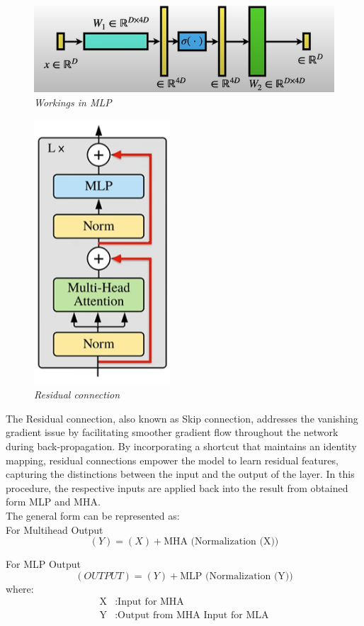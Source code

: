 \begin{figure}[htbp]
    \centering
    \includegraphics[width=5in]{img/MLP workings.png}
    \caption{\textit{Workings in MLP}}
\end{figure}
\newpage
\begin{figure}[htbp]
    \centering
    \includegraphics[width=2in]{img/residual connection.png}
    \caption{\textit{Residual connection}}
\end{figure}
The Residual connection, also known as Skip connection, addresses the vanishing gradient issue by facilitating smoother gradient flow throughout the network during back-propagation. By incorporating a shortcut that maintains an identity mapping, residual connections empower the model to learn residual features, capturing the distinctions between the input and the output of the layer.
In this procedure, the respective inputs are applied back into the result from obtained form MLP and MHA.\\
The general form can be represented as:\\

For Multihead Output\\
\[(Y) = (X)+\text{MHA (Normalization (X))}\]

For MLP Output
\[(OUTPUT) = (Y)+\text{MLP (Normalization (Y))}\] 
where:
\begin{align*}
    \text{X} & : \text{Input for MHA} \\
    \text{Y} & : \text{Output from MHA Input for MLA} \\
\end{align*}\\

